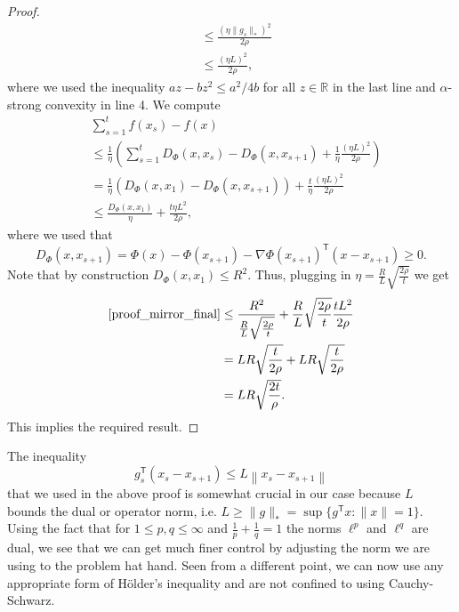 \begin{proof}
\begin{equation}
\begin{align*}
	& \leq \frac{\left(\eta \|g_s\|_\ast\right)^2}{2\rho} \\
    & \leq \frac{\left(\eta L\right)^2}{2\rho},
    \end{align*}
\end{equation}
where we used the inequality $az - bz^2 \leq a^2/4b$ for all $z\in \mathbb{R}$ in the last line and $\alpha$-strong convexity in line 4. We compute
\begin{align}
	& \sum_{s=1}^t f(x_s) - f(x) \nonumber \\
	& \leq  \frac{1}{\eta} \left(\sum_{s=1}^t D_\Phi(x, x_s) - D_\Phi(x, x_{s+1}) +  \frac{1}{\eta}\frac{\left(\eta L\right)^2}{2\rho}\right) \nonumber \\
	& =  \frac{1}{\eta} \left(D_\Phi(x, x_1) - D_\Phi(x, x_{s+1})\right) +  \frac{t}{\eta}\frac{\left(\eta L\right)^2}{2\rho} \nonumber \\ \label{proof_mirror_final}
	& \leq \frac{D_\Phi(x, x_1)}{\eta} + \frac{t\eta L^2}{2\rho},
\end{align}
where we used that 
\begin{equation*}
	D_\Phi(x, x_{s+1}) = \Phi(x) - \Phi(x_{s+1}) - \nabla \Phi(x_{s+1})^\mathsf{T}(x - x_{s+1}) \geq 0.
\end{equation*}
Note that by construction $D_\Phi(x,x_1) \leq R^2$. Thus, plugging in $\eta =\frac{R}{L}\sqrt{\frac{2\rho}{t}}$ we get
\begin{align*}
	\eqref{proof_mirror_final} &\leq \frac{R^2}{\frac{R}{L}\sqrt{\frac{2\rho}{t}}} + \frac{R}{L}\sqrt{\frac{2\rho}{t}}\frac{t L^2}{2\rho} \\
	& = LR \sqrt{\frac{t}{2 \rho}} + LR\sqrt{\frac{t}{2 \rho}} \\
	& = LR \sqrt{\frac{2t}{\rho}}.
\end{align*}
This implies the required result.
\end{proof}
\begin{remark}
The inequality
\begin{equation*}
g_s^\mathsf{T}\left(x_s - x_{s+1}\right) \leq L\left\|x_s - x_{s+1}\right\|
\end{equation*}
that we used in the above proof is somewhat crucial in our case because $L$ bounds the dual or operator norm, i.e. $L \geq \|g\|_* = \sup\{g^\mathsf{T}x : \|x\|=1\}$. Using the fact that for $1 \leq p, q \leq \infty$ and $\frac{1}{p} + \frac{1}{q} = 1$ the norms $\ell^p$ and $\ell^q$ are dual, we see that we can get much finer control by adjusting the norm we are using to the problem hat hand. Seen from a different point, we can now use any appropriate form of Hölder's inequality and are not confined to using Cauchy-Schwarz.
\end{remark}

